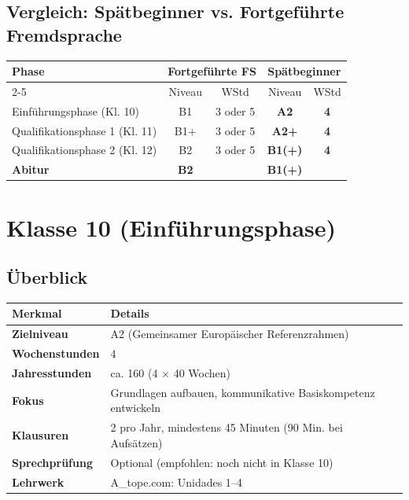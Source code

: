 \documentclass[10pt,a4paper]{article}
\begin{document}
\subsection{Vergleich: Spätbeginner vs. Fortgeführte Fremdsprache}

\begin{center}
\begin{tabular}{|l|c|c|c|c|}
\hline
\rowcolor{lightgray}
\textbf{Phase} & \multicolumn{2}{c|}{\textbf{Fortgeführte FS}} & \multicolumn{2}{c|}{\textbf{Spätbeginner}} \\
\cline{2-5}
\rowcolor{lightgray}
& Niveau & WStd & Niveau & WStd \\
\hline
Einführungsphase (Kl. 10) & B1 & 3 oder 5 & \textcolor{spaet}{\textbf{A2}} & \textcolor{spaet}{\textbf{4}} \\
\hline
Qualifikationsphase 1 (Kl. 11) & B1+ & 3 oder 5 & \textcolor{spaet}{\textbf{A2+}} & \textcolor{spaet}{\textbf{4}} \\
\hline
Qualifikationsphase 2 (Kl. 12) & B2 & 3 oder 5 & \textcolor{spaet}{\textbf{B1(+)}} & \textcolor{spaet}{\textbf{4}} \\
\hline
\textbf{Abitur} & \textbf{B2} & & \textcolor{spaet}{\textbf{B1(+)}} & \\
\hline
\end{tabular}
\end{center}

\newpage


\section{Klasse 10 (Einführungsphase)}

\subsection{Überblick}

\begin{center}
\begin{tabular}{|p{4cm}|p{9.5cm}|}
\hline
\rowcolor{spaet}\color{white}\textbf{Merkmal} & \color{white}\textbf{Details} \\
\hline
\textbf{Zielniveau} & A2 (Gemeinsamer Europäischer Referenzrahmen) \\
\hline
\textbf{Wochenstunden} & 4 \\
\hline
\textbf{Jahresstunden} & ca. 160 (4 $\times$ 40 Wochen) \\
\hline
\textbf{Fokus} & Grundlagen aufbauen, kommunikative Basiskompetenz entwickeln \\
\hline
\textbf{Klausuren} & 2 pro Jahr, mindestens 45 Minuten (90 Min. bei Aufsätzen) \\
\hline
\textbf{Sprechprüfung} & Optional (empfohlen: noch nicht in Klasse 10) \\
\hline
\textbf{Lehrwerk} & A\_tope.com: Unidades 1--4 \\
\hline
\end{tabular}
\end{center}
\end{document}
